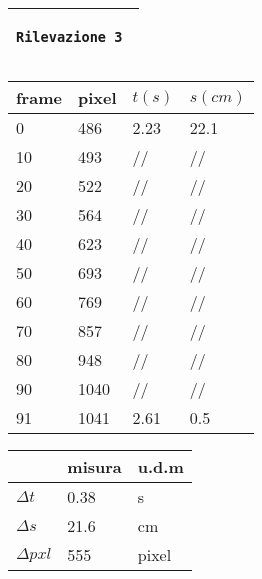 \documentclass{article}
\begin{document}
\newpage
\begin{center}
\begin{tabular}{|m{15em}|}
	\hline
	
	\begin{center}
		\texttt \bf \large Rilevazione 3
	\end{center} \\
	\hline
\end{tabular}

\vspace{15pt}

\begin{tabular}{ | m{3em} | m{3em} | m{2.5em}| m{2.5em} | } 
 \hline
 \vspace{5pt} frame \vspace{5pt}  &  pixel & $t(s)$ & $s(cm)$\\ 
 \hline
 \hline
 0 & 486 & 2.23  & 22.1\\ 
 \hline
 10 & 493 & //  & //\\
 \hline
 20 & 522 & //  & //\\ 
 \hline
 30 & 564 & //  & //\\ 
 \hline
 40 & 623 & //  & //\\ 
 \hline
 50 & 693 & //  & //\\ 
 \hline
 60 & 769 & //  & //\\ 
 \hline
 70 & 857 & //  & //\\ 
 \hline
 80 & 948 & //  & //\\ 
 \hline
 90 & 1040 & //  & //\\ 
 \hline
 91 & 1041 & 2.61  & 0.5\\ 
 \hline
\end{tabular}

\vspace{5pt}

\begin{tabular}{ | m{3em} | m{3em} | m{1cm}| } 
 \hline
   &  misura & u.d.m \\ 
 \hline
 \hline
 $\Delta t$   &  0.38 	& s\\
 \hline
 $\Delta s$   &  21.6	& cm\\
 \hline
 $\Delta pxl$ & 555	& pixel\\
 \hline
\end{tabular}
\end{center}

\end{document}
